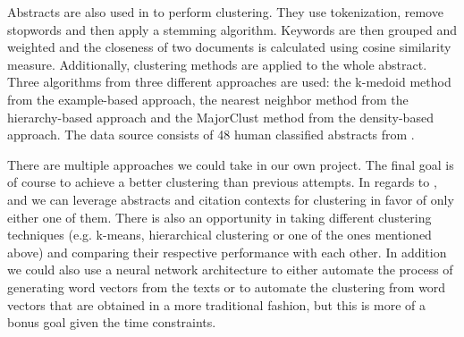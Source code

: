 Abstracts are also used in \cite{An_Approach_to_Clustering_Abstracts} to perform clustering. They use tokenization, remove stopwords and then apply a stemming algorithm.
Keywords are then grouped and weighted and the closeness of two documents is calculated using cosine similarity measure. 
Additionally, clustering methods are applied to the whole abstract. Three algorithms from three different approaches are used: the k-medoid method from the example-based approach, the nearest neighbor method from the hierarchy-based approach and the MajorClust method from the density-based approach. The data source consists of 48 human classified abstracts from \cite{cicling}.

There are multiple approaches we could take in our own project. The final goal is of course to achieve a better clustering than previous attempts.
In regards to \cite{An_Approach_to_Clustering_Abstracts}, \cite{Document_clustering_of_scientific_texts_using_citation_contexts} and \cite{Clustering_scientific_documents_with_topic_modeling} we can leverage abstracts and citation contexts for clustering in favor of only either one of them.
There is also an opportunity in taking different clustering techniques (e.g. k-means, hierarchical clustering or one of the ones mentioned above) and comparing their respective performance with each other.
In addition we could also use a neural network architecture to either automate the process of generating word vectors from the texts or to automate the clustering from word vectors that are obtained in a more traditional fashion, but this is more of a bonus goal given the time constraints.
